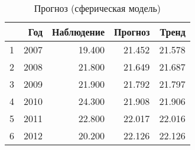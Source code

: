 \begin{table}[ht]
\centering
\begin{tabular}{rrrrr}
  \hline
 & Год & Наблюдение & Прогноз & Тренд \\ 
  \hline
1 & 2007 & 19.400 & 21.452 & 21.578 \\ 
  2 & 2008 & 21.800 & 21.649 & 21.687 \\ 
  3 & 2009 & 21.900 & 21.792 & 21.797 \\ 
  4 & 2010 & 24.300 & 21.908 & 21.906 \\ 
  5 & 2011 & 22.800 & 22.017 & 22.016 \\ 
  6 & 2012 & 20.200 & 22.126 & 22.126 \\ 
   \hline
\end{tabular}
\caption{Прогноз (сферическая модель)} 
\label{table:manual-prediction}
\end{table}
